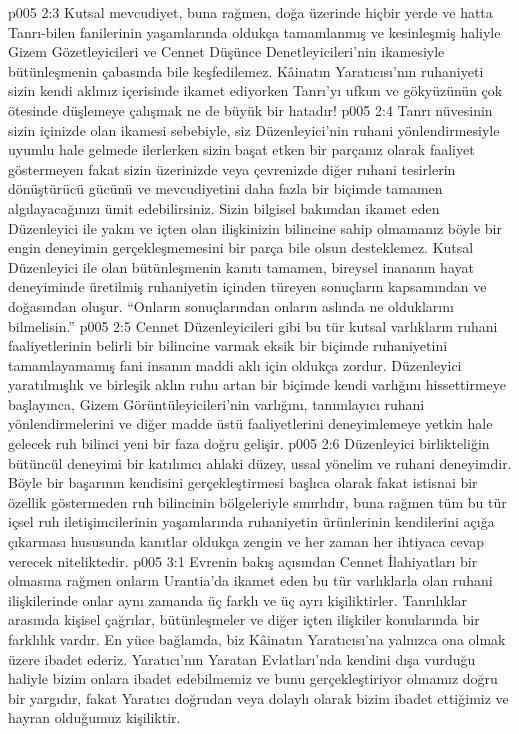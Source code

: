 \vs p005 2:3 Kutsal mevcudiyet, buna rağmen, doğa üzerinde hiçbir yerde ve hatta Tanrı\hyp{}bilen fanilerinin yaşamlarında oldukça tamamlanmış ve kesinleşmiş haliyle Gizem Gözetleyicileri ve Cennet Düşünce Denetleyicileri’nin ikamesiyle bütünleşmenin çabasında bile keşfedilemez. Kâinatın Yaratıcısı’nın ruhaniyeti sizin kendi aklınız içerisinde ikamet ediyorken Tanrı’yı ufkun ve gökyüzünün çok ötesinde düşlemeye çalışmak ne de büyük bir hatadır!
\vs p005 2:4 Tanrı nüvesinin sizin içinizde olan ikamesi sebebiyle, siz Düzenleyici’nin ruhani yönlendirmesiyle uyumlu hale gelmede ilerlerken sizin başat etken bir parçanız olarak faaliyet göstermeyen fakat sizin üzerinizde veya çevrenizde diğer ruhani tesirlerin dönüştürücü gücünü ve mevcudiyetini daha fazla bir biçimde tamamen algılayacağınızı ümit edebilirsiniz. Sizin bilgisel bakımdan ikamet eden Düzenleyici ile yakın ve içten olan ilişkinizin bilincine sahip olmamanız böyle bir engin deneyimin gerçekleşmemesini bir parça bile olsun desteklemez. Kutsal Düzenleyici ile olan bütünleşmenin kanıtı tamamen, bireysel inananın hayat deneyiminde üretilmiş ruhaniyetin içinden türeyen sonuçların kapsamından ve doğasından oluşur. “Onların sonuçlarından onların aslında ne olduklarını bilmelisin.”
\vs p005 2:5 Cennet Düzenleyicileri gibi bu tür kutsal varlıkların ruhani faaliyetlerinin belirli bir bilincine varmak eksik bir biçimde ruhaniyetini tamamlayamamış fani insanın maddi aklı için oldukça zordur. Düzenleyici yaratılmışlık ve birleşik aklın ruhu artan bir biçimde kendi varlığını hissettirmeye başlayınca, Gizem Görüntüleyicileri’nin varlığını, tanımlayıcı ruhani yönlendirmelerini ve diğer madde üstü faaliyetlerini deneyimlemeye yetkin hale gelecek ruh bilinci yeni bir faza doğru gelişir.
\vs p005 2:6 Düzenleyici birlikteliğin bütüncül deneyimi bir katılımcı ahlaki düzey, ussal yönelim ve ruhani deneyimdir. Böyle bir başarının kendisini gerçekleştirmesi başlıca olarak fakat istisnai bir özellik göstermeden ruh bilincinin bölgeleriyle sınırlıdır, buna rağmen tüm bu tür içsel ruh iletişimcilerinin yaşamlarında ruhaniyetin ürünlerinin kendilerini açığa çıkarması hususunda kanıtlar oldukça zengin ve her zaman her ihtiyaca cevap verecek niteliktedir.
\vs p005 3:1 Evrenin bakış açısından Cennet İlahiyatları bir olmasına rağmen onların Urantia’da ikamet eden bu tür varlıklarla olan ruhani ilişkilerinde onlar aynı zamanda üç farklı ve üç ayrı kişiliktirler. Tanrılıklar arasında kişisel çağrılar, bütünleşmeler ve diğer içten ilişkiler konularında bir farklılık vardır. En yüce bağlamda, biz Kâinatın Yaratıcısı’na yalnızca ona olmak üzere ibadet ederiz. Yaratıcı’nın Yaratan Evlatları’nda kendini dışa vurduğu haliyle bizim onlara ibadet edebilmemiz ve bunu gerçekleştiriyor olmamız doğru bir yargıdır, fakat Yaratıcı doğrudan veya dolaylı olarak bizim ibadet ettiğimiz ve hayran olduğumuz kişiliktir.
